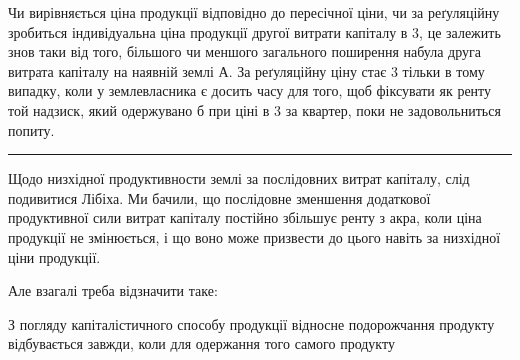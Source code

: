 Чи вирівняється ціна продукції відповідно до пересічної ціни, чи за реґуляційну
зробиться індивідуальна ціна продукції другої витрати капіталу в 3,
це залежить знов таки від того, більшого чи меншого загального поширення набула
друга витрата капіталу на наявній землі $А$. За реґуляційну ціну стає 3 тільки в тому випадку, коли у землевласника є досить часу для того,
щоб фіксувати як ренту той надзиск, який одержувано б при ціні в 3 за квартер, поки не задовольниться попиту.

\pfbreak

Щодо низхідної продуктивности землі за послідовних витрат капіталу,
слід подивитися Лібіха. Ми бачили, що послідовне зменшення додаткової продуктивної
сили витрат капіталу постійно збільшує ренту з акра, коли ціна
продукції не змінюється, і що воно може призвести до цього навіть за низхідної
ціни продукції.

Але взагалі треба відзначити таке:

З погляду капіталістичного способу продукції відносне подорожчання
продукту відбувається завжди, коли для одержання того самого продукту
\parbreak{}  %
